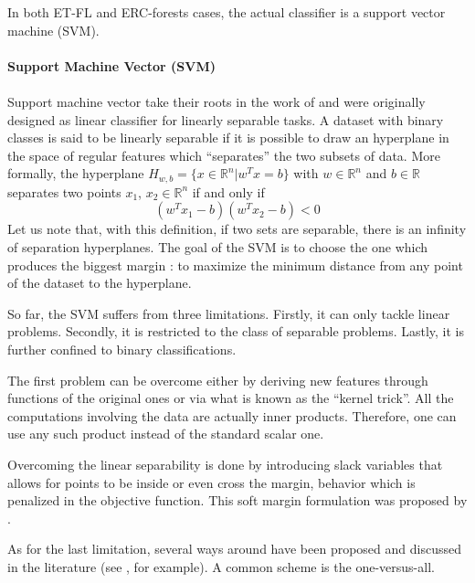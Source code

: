 \documentclass[a4paper]{report}
\begin{document}
		In both ET-FL and ERC-forests cases, the actual classifier is a support vector machine (SVM).
		\begin{leftbar}
			\paragraph{Support Machine Vector (SVM)}
			\paragraph{}
			Support machine vector take their roots in the work of \cite{svm} and were originally designed as linear classifier for linearly separable tasks. A dataset with binary classes is said to be linearly separable if it is possible to draw an hyperplane in the space of regular features which ``separates'' the two subsets of data.
			More formally, the hyperplane $H_{w,b} = \{x \in \mathbb{R}^n | w^T x = b\}$ with $w \in \mathbb{R}^n$ and $b \in \mathbb{R}$ separates two points $x_1$, $x_2 \in \mathbb{R}^n$ if and only if 
			\[
				(w^T x_1 - b)(w^T x_2 - b) < 0
			\] 
			Let us note that, with this definition, if two sets are separable, there is an infinity of separation hyperplanes. The goal of the SVM is to choose the one which produces the biggest margin : to maximize the minimum distance from any point of the dataset to the hyperplane.
			\par
			So far, the SVM suffers from three limitations. Firstly, it can only tackle linear problems. Secondly, it is restricted to the class of separable problems. Lastly, it is further confined to binary classifications. 
			\par
			The first problem can be overcome either by deriving new features through functions of the original ones or via what is known as the ``kernel trick''. All the computations involving the data are actually inner products. Therefore, one can use any such product instead of the standard scalar one. 
			\par
			Overcoming the linear separability is done by introducing slack variables that allows for points to be inside or even cross the margin, behavior which is penalized in the objective function. This soft margin formulation was proposed by \cite{svmsoft}.
			\par
			As for the last limitation, several ways around have been proposed and discussed in the literature (see \cite{svmmulticlass}, for example). A common scheme is the one-versus-all. 
		\end{leftbar}
\end{document}
